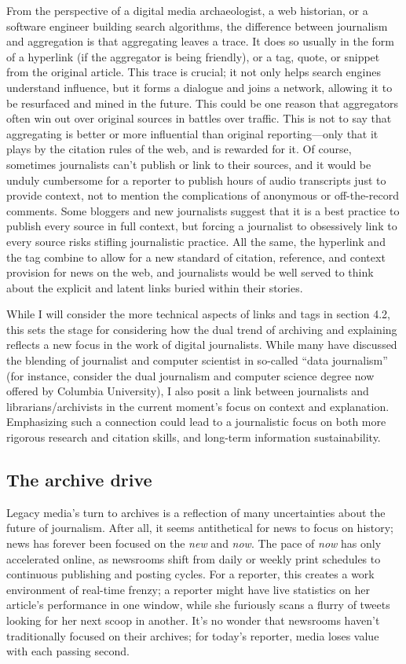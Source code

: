 From the perspective of a digital media archaeologist, a web historian, or a software engineer building search algorithms, the difference between journalism and aggregation is that aggregating leaves a trace. It does so usually in the form of a hyperlink (if the aggregator is being friendly), or a tag, quote, or snippet from the original article. This trace is crucial; it not only helps search engines understand influence, but it forms a dialogue and joins a network, allowing it to be resurfaced and mined in the future. This could be one reason that aggregators often win out over original sources in battles over traffic. This is not to say that aggregating is better or more influential than original reporting---only that it plays by the citation rules of the web, and is rewarded for it. Of course, sometimes journalists can't publish or link to their sources, and it would be unduly cumbersome for a reporter to publish hours of audio transcripts just to provide context, not to mention the complications of anonymous or off-the-record comments. Some bloggers and new journalists suggest that it is a best practice to publish every source in full context, but forcing a journalist to obsessively link to every source risks stifling journalistic practice. All the same, the hyperlink and the tag combine to allow for a new standard of citation, reference, and context provision for news on the web, and journalists would be well served to think about the explicit and latent links buried within their stories.

While I will consider the more technical aspects of links and tags in section 4.2, this sets the stage for considering how the dual trend of archiving and explaining reflects a new focus in the work of digital journalists. While many have discussed the blending of journalist and computer scientist in so-called ``data journalism'' (for instance, consider the dual journalism and computer science degree now offered by Columbia University), I also posit a link between journalists and librarians/archivists in the current moment's focus on context and explanation. Emphasizing such a connection could lead to a journalistic focus on both more rigorous research and citation skills, and long-term information sustainability.

\subsection{The archive drive}

Legacy media's turn to archives is a reflection of many uncertainties about the future of journalism. After all, it seems antithetical for news to focus on history; news has forever been focused on the \emph{new} and \emph{now}. The pace of \emph{now} has only accelerated online, as newsrooms shift from daily or weekly print schedules to continuous publishing and posting cycles. For a reporter, this creates a work environment of real-time frenzy; a reporter might have live statistics on her article's performance in one window, while she furiously scans a flurry of tweets looking for her next scoop in another. It's no wonder that newsrooms haven't traditionally focused on their archives; for today's reporter, media loses value with each passing second.

